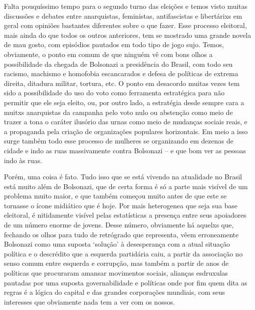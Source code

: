 Falta pouquíssimo tempo para o segundo turno das eleições e temos visto muitas discussões e debates entre anarquistas, feministas, antifascistas e libertárixs em geral com opiniões bastantes diferentes sobre o que fazer. Esse processo eleitoral, mais ainda do que todos os outros anteriores, tem se mostrado uma grande novela de mau gosto, com episódios pautados em todo tipo de jogo sujo. Temos, obviamente, o ponto em comum de que ninguém vê com bons olhos a possibilidade da chegada de Bolsonazi a presidência do Brasil, com todo seu racismo, machismo e homofobia escancarados e defesa de políticas de extrema direita, ditadura militar, tortura, etc.
O ponto em desacordo muitas vezes tem sido a possibilidade do uso do voto como ferramenta estratégica para não permitir que ele seja eleito, ou, por outro lado, a estratégia desde sempre cara a muitxs anarquistas da campanha pelo voto nulo ou abstenção como meio de trazer a tona o caráter ilusório das urnas como meio de mudanças sociais reais, e a propaganda pela criação de organizações populares horizontais. Em meio a isso surge também todo esse processo de mulheres se organizando em dezenas de cidade e indo as ruas massivamente contra Bolsonazi – e que bom ver as pessoas indo às ruas.

Porém, uma coisa é fato. Tudo isso que se está vivendo na atualidade no Brasil está muito além de Bolsonazi, que de certa forma é só a parte mais visível de um problema muito maior, e que também começou muito antes de que este se tornasse o ícone midiático que é hoje. Por mais heterogenea que seja sua base eleitoral, é nitidamente visível pelas estatísticas a presença entre seus apoiadores de um número enorme de jovens. Desse número, obviamente há aquelxs que, fechando os olhos para tudo de retrógrado que representa, vêem erroneamente Bolsonazi como uma suposta ‘solução’ à desesperança com a atual situação política e o descrédito que a esquerda partidária caiu, a partir da associação no senso comum entre esquerda e corrupção, mas também a partir de anos de políticas que procuraram amansar movimentos sociais, alianças esdruxulas pautadas por uma suposta governabilidade e políticas onde por fim quem dita as regras é a lógica do capital e das grandes corporações mundiais, com seus interesses que obviamente nada tem a ver com os nossos.

